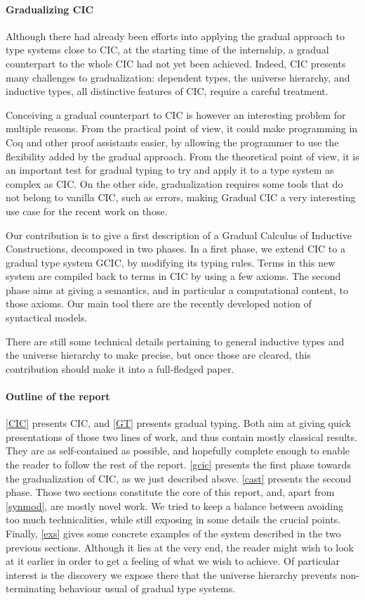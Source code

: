 \documentclass{kaobook}
\DeclareMathOperator{\?}{?}
\newcommand{\gcic}{GCIC}
\begin{document}
{\paragraph{Gradualizing CIC}
Although there had already been efforts into applying the gradual approach to type systems close to CIC, at the starting time of the internship, a gradual counterpart to the whole CIC had not yet been achieved. Indeed, CIC presents many challenges to gradualization: dependent types, the universe hierarchy, and inductive types, all distinctive features of CIC, require a careful treatment.

Conceiving a gradual counterpart to CIC is however an interesting problem for multiple reasons. From the practical point of view, it could make programming in Coq and other proof assistants easier, by allowing the programmer to use the flexibility added by the gradual approach. From the theoretical point of view, it is an important test for gradual typing to try and apply it to a type system as complex as CIC. On the other side, gradualization requires some tools that do not belong to vanilla CIC, such as errors, making Gradual CIC a very interesting use case for the recent work on those.

Our contribution is to give a first description of a Gradual Calculus of Inductive Constructions, decomposed in two phases. In a first phase, we extend CIC to a gradual type system \gcic, by modifying its typing rules. Terms in this new system are compiled back to terms in CIC by using a few axioms. The second phase aims at giving a semantics, and in particular a computational content, to those axioms. Our main tool there are the recently developed notion of syntactical models.

There are still some technical details pertaining to general inductive types and the universe hierarchy to make precise, but once those are cleared, this contribution should make it into a full-fledged paper.

\paragraph{Outline of the report}
\autoref{CIC} presents CIC, and \autoref{GT} presents gradual typing. Both aim at giving quick presentations of those two lines of work, and thus contain mostly classical results. They are as self-contained as possible, and hopefully complete enough to enable the reader to follow the rest of the report. \autoref{gcic} presents the first phase towards the gradualization of CIC, as we just described above. \autoref{cast} presents the second phase. Those two sections constitute the core of this report, and, apart from \autoref{synmod}, are mostly novel work. We tried to keep a balance between avoiding too much technicalities, while still exposing in some details the crucial points. Finally, \autoref{exs} gives some concrete examples of the system described in the two previous sections. Although it lies at the very end, the reader might wish to look at it earlier in order to get a feeling of what we wish to achieve. Of particular interest is the discovery we expose there that the universe hierarchy prevents non-terminating behaviour usual of gradual type systems.


}
\end{document}
